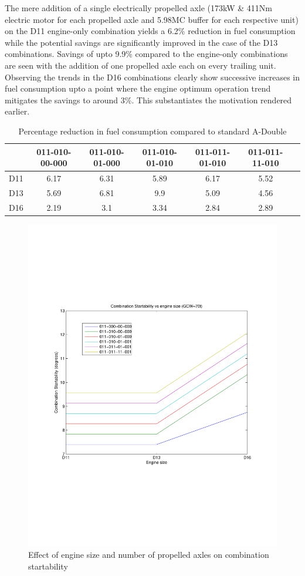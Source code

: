 \documentclass{article}
\begin{document}
The mere addition of a single electrically propelled axle (173kW \& 411Nm electric motor for each propelled axle and 5.98MC buffer for each respective unit) on the D11 engine-only combination yields a 6.2\% reduction in fuel consumption while the potential savings are significantly improved in the case of the D13 combinations. Savings of upto 9.9\% compared to the engine-only combinations are seen with the addition of one propelled axle each on every trailing unit. Observing the trends in the D16 combinations clearly show successive increases in fuel consumption upto a point where the engine optimum operation trend mitigates the savings to around 3\%. This substantiates the motivation rendered earlier.\\

\begin{table}[h!]
\centering
\begin{tabular}{|c|c|c|c|c|c|c|}
\hline
& 011-010-00-000 & 011-010-01-000 & 011-010-01-010 & 011-011-01-010 & 011-011-11-010 \\
\hline
D11 & 6.17 & 6.31 & 5.89 & 6.17 & 5.52 \\
\hline
D13 & 5.69 & 6.81 & 9.9 & 5.09 & 4.56 \\
\hline
D16 & 2.19 & 3.1 & 3.34 & 2.84 & 2.89 \\
\hline
\end{tabular}
\caption{Percentage reduction in fuel consumption compared to standard A-Double}
\label{table:fuelConsumptionReductionAxles}
\end{table}

\begin{figure}[h!]
\centering
\includegraphics[width=0.5\linewidth, clip=true, trim=45 185 65 208]{Figures/Increasing_number_of_axles/Combination_startability_vs_axle_number_and_engine_size.pdf}
\caption{Effect of engine size and number of propelled axles on combination startability}
\label{startabilityEngineNumberOfAxles}
\end{figure}
\end{document}
